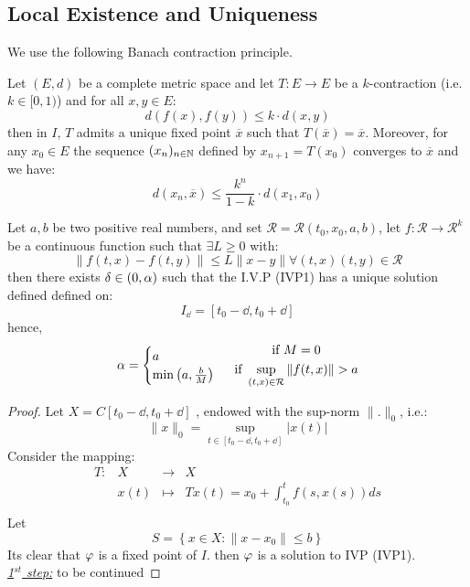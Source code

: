 \subsection{Local Existence and Uniqueness}
We use the following Banach contraction principle.
\begin{theorem}[]
Let $(E, d)  $  be a complete metric space and let $ T : E \longrightarrow E $ be a 
$k $-contraction (i.e. $k \in [0, 1) $) and for all 
$x,y \in  E $: 
\[
d(f(x) , f(y) )  \leq  k \cdot  d(x, y) 
\]
then in $I $, $T$ admits a unique fixed point $\overline{x}$ such that $T(\overline{x}) = \overline{x}  $. Moreover,
for any $x_0 \in  E $ the sequence 
$(x_n )_{n \in  \mathbb{N}}  $ defined by $x_{n+1} = T(x_0)  $ converges to $\overline{x} $ and we have: 
\[
d(x_n , \overline{x})  \leq 
\frac{k^{n}}{1-k} \cdot d(x_1, x_0) 
\]
\end{theorem}
\begin{theorem}[]
Let $a, b $ be two positive real numbers, and set $\mathcal{R} = \mathcal{R} (t_0, x_0, a, b)  $, 
let $ f : \mathcal{R}  \longrightarrow \mathcal{R} ^{k} $ be a continuous function such that 
$\exists L \geq  0$ with: 
\[
\| f(t,x)  - f(t,y)  \|  \leq  L \| x-y \|  \forall (t, x) (t, y) \in \mathcal{R} 
\]
then there exists $\delta  \in  (0, \alpha)  $ such that 
the I.V.P (IVP1) has a unique solution defined defined on: 
\[
I_{\dd } = 
\left[ t_0 - \dd , t_0 + \dd  \right]
\]
hence, 
\[
  \alpha = \begin{cases}
  a \\
  \min  \left( a, \frac{b}{M} \right) \\
  \end{cases}
  \begin{gathered}  
  \text{ if } M = 0 \\ 
  \text{ if } \sup_{(t, x) \in  \mathcal{R} }  
  \| f(t, x)  \| > a \\
  \end{gathered}
\]
\end{theorem}
\begin{proof}
Let $X = C \left[ t_0 - \dd , t_0 + \dd  \right] $ , endowed 
with the sup-norm $\| . \| _{ 0 } $, i.e.: 
\[
\| x \| _{0} = 
\sup_{t \in \left[ t_0 - \dd , t_0 + \dd  \right]} 
\left| x(t)  \right|
\]
Consider the mapping:
\[
\begin{array}{cccc}
      T : &  X  & \longrightarrow & X \\

           &  x(t)   & \longmapsto     & T x(t) = x_0+ \int_{t_0}^{t} 
           f(s, x(s) ) ds\\ 
\end{array}
\]
Let 
\[
S = \left\{ x \in  X: \| x-x_0 \| \leq b \right\}
\]
Its clear that $\varphi  $ is a fixed point of 
$I $. then $\varphi  $ is a solution to IVP (IVP1). \\
\underline{\emph{1$^{st}$ step:}} to be continued
\end{proof}
